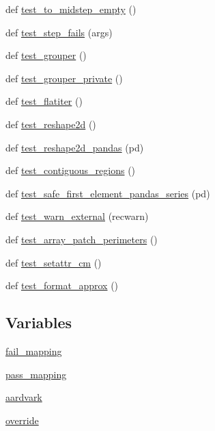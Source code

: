 \begin{DoxyCompactItemize}
\item 
def \hyperlink{namespacematplotlib_1_1tests_1_1test__cbook_aa588e861b714ace36ca23851b7d7f940}{test\+\_\+to\+\_\+midstep\+\_\+empty} ()
\item 
def \hyperlink{namespacematplotlib_1_1tests_1_1test__cbook_a1812939a9f4fac68841e227f1f7d19d7}{test\+\_\+step\+\_\+fails} (args)
\item 
def \hyperlink{namespacematplotlib_1_1tests_1_1test__cbook_a4dba90c3e3e2ed7934dd5b972d30bfe4}{test\+\_\+grouper} ()
\item 
def \hyperlink{namespacematplotlib_1_1tests_1_1test__cbook_a2afd39f76b14cdbc47d1c21dedad5ddf}{test\+\_\+grouper\+\_\+private} ()
\item 
def \hyperlink{namespacematplotlib_1_1tests_1_1test__cbook_a818964d0c2148ae91e06a59cd64bb2ab}{test\+\_\+flatiter} ()
\item 
def \hyperlink{namespacematplotlib_1_1tests_1_1test__cbook_a784f51893d70b545d0ec7756ca529806}{test\+\_\+reshape2d} ()
\item 
def \hyperlink{namespacematplotlib_1_1tests_1_1test__cbook_a958d05b87f92a8977ef99f0668360c1e}{test\+\_\+reshape2d\+\_\+pandas} (pd)
\item 
def \hyperlink{namespacematplotlib_1_1tests_1_1test__cbook_aadd7c55cb85a5fc763ca646a219f1f41}{test\+\_\+contiguous\+\_\+regions} ()
\item 
def \hyperlink{namespacematplotlib_1_1tests_1_1test__cbook_a4bdee039e1ef2dcec6542a4b0947e33c}{test\+\_\+safe\+\_\+first\+\_\+element\+\_\+pandas\+\_\+series} (pd)
\item 
def \hyperlink{namespacematplotlib_1_1tests_1_1test__cbook_a5bb8a6bd3c1fee974aa92f704d8fa008}{test\+\_\+warn\+\_\+external} (recwarn)
\item 
def \hyperlink{namespacematplotlib_1_1tests_1_1test__cbook_a20850cbb26f5e7e855671007633accdc}{test\+\_\+array\+\_\+patch\+\_\+perimeters} ()
\item 
def \hyperlink{namespacematplotlib_1_1tests_1_1test__cbook_a1bd3cc22178424fe6af57d27865ae44c}{test\+\_\+setattr\+\_\+cm} ()
\item 
def \hyperlink{namespacematplotlib_1_1tests_1_1test__cbook_a65886bba56e9eaeac1d096f52a5fe14d}{test\+\_\+format\+\_\+approx} ()
\end{DoxyCompactItemize}
\subsection*{Variables}
\begin{DoxyCompactItemize}
\item 
\hyperlink{namespacematplotlib_1_1tests_1_1test__cbook_aab65242f83979406f7a94d362db23eb0}{fail\+\_\+mapping}
\item 
\hyperlink{namespacematplotlib_1_1tests_1_1test__cbook_af9eeb8afd9256db5db4490709cca5580}{pass\+\_\+mapping}
\item 
\hyperlink{namespacematplotlib_1_1tests_1_1test__cbook_ad6bc1764d519c4e08dfe354e5900b086}{aardvark}
\item 
\hyperlink{namespacematplotlib_1_1tests_1_1test__cbook_aed0c50928d923cb2d634c19c5a85b9b3}{override}
\end{DoxyCompactItemize}


